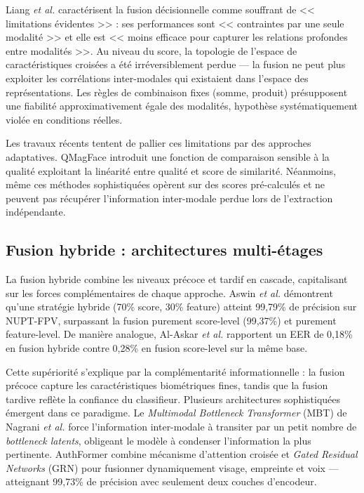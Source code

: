 \documentclass[12pt,a4paper]{report}
\begin{document}
Liang \textit{et al.} \cite{liang2024deep} caract\'{e}risent la fusion d\'{e}cisionnelle comme souffrant de << limitations \'{e}videntes >> : ses performances sont << contraintes par une seule modalit\'{e} >> et elle est << moins efficace pour capturer les relations profondes entre modalit\'{e}s >>. Au niveau du score, la topologie de l'espace de caract\'{e}ristiques crois\'{e}es a \'{e}t\'{e} irr\'{e}versiblement perdue --- la fusion ne peut plus exploiter les corr\'{e}lations inter-modales qui existaient dans l'espace des repr\'{e}sentations. Les r\`{e}gles de combinaison fixes (somme, produit) pr\'{e}supposent une fiabilit\'{e} approximativement \'{e}gale des modalit\'{e}s, hypoth\`{e}se syst\'{e}matiquement viol\'{e}e en conditions r\'{e}elles.

Les travaux r\'{e}cents tentent de pallier ces limitations par des approches adaptatives. QMagFace \cite{terhorst2023qmagface} introduit une fonction de comparaison sensible \`{a} la qualit\'{e} exploitant la lin\'{e}arit\'{e} entre qualit\'{e} et score de similarit\'{e}. N\'{e}anmoins, m\^{e}me ces m\'{e}thodes sophistiqu\'{e}es op\`{e}rent sur des scores pr\'{e}-calcul\'{e}s et ne peuvent pas r\'{e}cup\'{e}rer l'information inter-modale perdue lors de l'extraction ind\'{e}pendante.

\subsection{Fusion hybride : architectures multi-\'{e}tages}

La fusion hybride combine les niveaux pr\'{e}coce et tardif en cascade, capitalisant sur les forces compl\'{e}mentaires de chaque approche. Aswin \textit{et al.} \cite{aswin2025deep} d\'{e}montrent qu'une strat\'{e}gie hybride (70\% score, 30\% feature) atteint 99,79\% de pr\'{e}cision sur NUPT-FPV, surpassant la fusion purement score-level (99,37\%) et purement feature-level. De mani\`{e}re analogue, Al-Askar \textit{et al.} \cite{alaskar2025deep} rapportent un EER de 0,18\% en fusion hybride contre 0,28\% en fusion score-level sur la m\^{e}me base.

Cette sup\'{e}riorit\'{e} s'explique par la compl\'{e}mentarit\'{e} informationnelle : la fusion pr\'{e}coce capture les caract\'{e}ristiques biom\'{e}triques fines, tandis que la fusion tardive refl\`{e}te la confiance du classifieur. Plusieurs architectures sophistiqu\'{e}es \'{e}mergent dans ce paradigme. Le \textit{Multimodal Bottleneck Transformer} (MBT) de Nagrani \textit{et al.} \cite{nagrani2021attention} force l'information inter-modale \`{a} transiter par un petit nombre de \textit{bottleneck latents}, obligeant le mod\`{e}le \`{a} condenser l'information la plus pertinente. AuthFormer \cite{yang2024authformer} combine m\'{e}canisme d'attention crois\'{e}e et \textit{Gated Residual Networks} (GRN) pour fusionner dynamiquement visage, empreinte et voix --- atteignant 99,73\% de pr\'{e}cision avec seulement deux couches d'encodeur.
\end{document}
